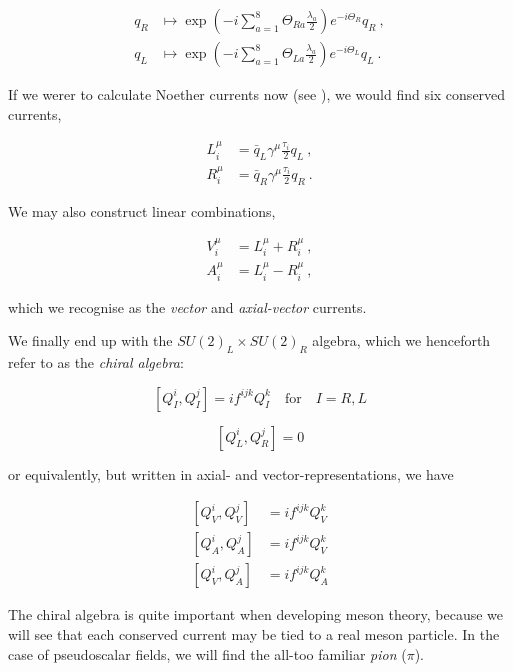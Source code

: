 \documentclass[10pt,twoside]{report}
\begin{document}
	\begin{align}
		q_R &\mapsto \exp\left( -i\sum_{a=1}^8 \Theta_{Ra}\frac{\lambda_a}{2} \right)e^{-i\Theta_R}q_R\:, \\
		q_L &\mapsto \exp\left( -i\sum_{a=1}^8 \Theta_{La}\frac{\lambda_a}{2} \right)e^{-i\Theta_L}q_L\:.
	\end{align}
	
	If we werer to calculate Noether currents now (see \cite{SchererSchingler12}), we would find six conserved currents,
	
	\begin{align}
		L_i^\mu &= \bar{q}_L\gamma^\mu\frac{\tau_i}{2}q_L\:, \\
		R_i^\mu &= \bar{q}_R\gamma^\mu\frac{\tau_i}{2}q_R\:.
	\end{align}
	
	We may also construct linear combinations,
	
	\begin{align}
		V_i^\mu &= L_i^\mu + R_i^\mu\:, \\
		A_i^\mu &= L_i^\mu - R_i^\mu\:,
	\end{align}
	
	\noindent which we recognise as the \emph{vector} and \emph{axial-vector} currents.
	
	We finally end up with the $SU(2)_L\times SU(2)_R$ algebra, which we henceforth refer to as the \emph{chiral algebra}:
	
	\begin{equation}
	\left[Q_I^i, Q_I^j\right] = if^{ijk}Q_I^k \quad \text{for}\quad I=R,L
	\end{equation}
	
	\begin{equation}
	\left[Q_L^i, Q_R^j\right] = 0
	\end{equation}
	
	\noindent or equivalently, but written in axial- and vector-representations, we have
	
	\begin{align}
		\left[Q_V^i, Q_V^j\right] &= if^{ijk}Q_V^k \\
		\left[Q_A^i, Q_A^j\right] &= if^{ijk}Q_V^k \\
		\left[Q_V^i, Q_A^j\right] &= if^{ijk}Q_A^k 
	\end{align}
	
	The chiral algebra is quite important when developing meson theory, because we will see that each conserved current may be tied to a real meson particle. In the case of pseudoscalar fields, we will find the all-too familiar \emph{pion} ($\pi$).
	
\end{document}
